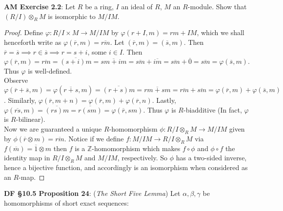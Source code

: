 \documentclass[8pt]{amsart}
\theoremstyle{plain}%
\theoremstyle{definition}
\theoremstyle{remark}
\numberwithin{equation}{section}
\newcommand{\Z}{\mathbb{Z}}
\begin{document}
\textbf{ AM Exercise 2.2}: Let $R$ be a ring, $I$ an ideal of $R$, $M$ an $R$-module. Show that $(R/I) \otimes_RM$ is isomorphic to $M/IM$. 
	\begin{proof}
		Define $\varphi : R/I \times M \to M/IM$ by $\varphi(r + I, m) = rm + IM$, which we shall henceforth write as $\varphi(\overline{r}, m) = \overline{rm}$. Let $(\overline{r}, m) = (\overline{s}, m)$. Then $\overline{r} = \overline{s} \implies r \in \overline{s} \implies r=s+i$, some $i \in I$. Then $\varphi(\overline{r},m)=\overline{rm}=\overline{(s+i)m}=\overline{sm+im}=\overline{sm}+\overline{im}=\overline{sm}+\overline{0}=\overline{sm}=\varphi(\overline{s},m)$. Thus $\varphi$ is well-defined.\\ 
		
		Observe $\varphi(\overline{r}+\overline{s},m)=\varphi(\overline{r+s},m)=\overline{(r+s)m}=\overline{rm+sm}=\overline{rm}+\overline{sm}=\varphi(\overline{r},m)+\varphi(\overline{s},m)$. Similarly, $\varphi(\overline{r},m+n)=\varphi(\overline{r},m)+\varphi(\overline{r},n)$. Lastly, $\varphi(\overline{rs},m)=\overline{(rs)m}=\overline{r(sm)}=\varphi(\overline{r},sm)$. Thus $\varphi$ is $R$-biadditive (In fact, $\varphi$ is $R$-bilinear).\\
		
		 Now we are guaranteed a unique $R$-homomorphism $\phi : R/I \otimes_RM \rightarrow M/IM$ given by $\phi(\overline{r} \otimes m)=\overline{rm}$. Notice if we define $f : M/IM \rightarrow R/I \otimes_RM$ via $f(\overline{m})=\overline{1}\otimes m$ then $f$ is a $\Z$-homomorphism which makes $f \circ \phi$ and $\phi \circ f$ the identity map in $R/I \otimes_RM$ and $M/IM$, respectively. So $\phi$ has a two-sided inverse, hence a bijective function, and accordingly is an isomorphism when considered as an $R$-map. 
	\end{proof}
		 

\textbf{DF \S10.5 Proposition 24}: (\textit{The Short Five Lemma}) Let $\alpha, \beta, \gamma$ be homomorphisms of short exact sequences:\\

	\begin{center}
	\end{center}
\end{document}

